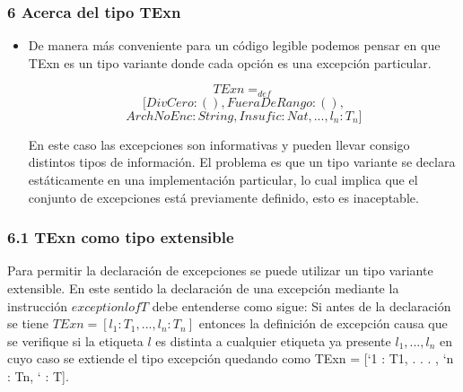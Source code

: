 \documentclass[xcolor=dvipsnames,table,spanish]{beamer}
\begin{document}
\begin{frame}
\frametitle{6 Acerca del tipo TExn}
\begin{itemize}

\item De manera más conveniente para un código legible podemos pensar en que TExn es un tipo variante donde cada opción es una excepción particular.

\begin{example}
\[TExn =_{def}\] \[[DivCero:(),FueraDeRango:(),\]\[ArchNoEnc:String,Insufic:Nat,...,l_n:T_n]\]
\end{example}
En este caso las excepciones son informativas y pueden llevar consigo distintos tipos de información. El problema es que un tipo variante se declara estáticamente en una implementación particular, lo cual implica que el conjunto de excepciones está previamente definido, esto es inaceptable.
\end{itemize}
\end{frame}

\begin{frame}
\frametitle{6.1 TExn como tipo extensible}
Para permitir la declaración de excepciones se puede utilizar un tipo variante extensible.\newline
En este sentido la declaración de una excepción mediante la instrucción $exception l of T$ debe entenderse como sigue: Si antes de la declaración se tiene $TExn = [l_1 : T_1, . . . , l_n : T_n]$ entonces la definición de excepción causa que se verifique si la etiqueta $l$ es distinta a cualquier etiqueta ya presente $l_1, . . . , l_n$ en cuyo caso se extiende el tipo excepción quedando como TExn = [`1 : T1, . . . , `n : Tn, ` : T].
\end{frame}
\end{document}

